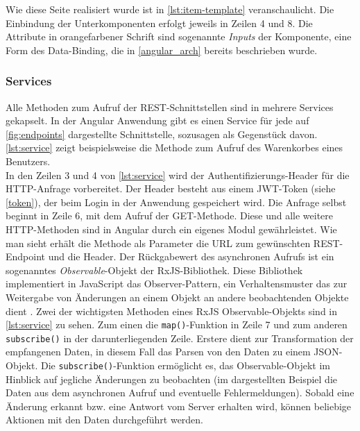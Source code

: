 Wie diese Seite realisiert wurde ist in \cref{lst:item-template} veranschaulicht. Die Einbindung der Unterkomponenten erfolgt jeweils in Zeilen 4 und 8. Die Attribute in orangefarbener Schrift sind sogenannte \textit{Inputs} der Komponente, eine Form des Data-Binding, die in \cref{angular_arch} bereits beschrieben wurde.
\\


\subsubsection{Services}
Alle Methoden zum Aufruf der \acs{REST}-Schnittstellen sind in mehrere Services gekapselt. In der Angular Anwendung gibt es einen Service für jede auf \cref{fig:endpoints} dargestellte Schnittstelle, sozusagen als Gegenstück davon. \cref{lst:service} zeigt beispielsweise die Methode zum Aufruf des Warenkorbes eines Benutzers.
\\


In den Zeilen 3 und 4 von \cref{lst:service} wird der Authentifizierungs-Header für die HTTP-Anfrage vorbereitet. Der Header besteht aus einem JWT-Token (siehe \cref{token}), der beim Login in der Anwendung gespeichert wird. Die Anfrage selbst beginnt in Zeile 6, mit dem Aufruf der GET-Methode. Diese und alle weitere HTTP-Methoden sind in Angular durch ein eigenes Modul gewährleistet. Wie man sieht erhält die Methode als Parameter die URL zum gewünschten REST-Endpoint und die Header. Der Rückgabewert des asynchronen Aufrufs ist ein sogenanntes \textit{Observable}-Objekt der RxJS-Bibliothek. Diese Bibliothek implementiert in JavaScript das Observer-Pattern, ein Verhaltensmuster das zur Weitergabe von Änderungen an einem Objekt an andere beobachtenden Objekte dient \cite{Angular.io2017b}.
\newpage
Zwei der wichtigsten Methoden eines RxJS Observable-Objekts sind in \cref{lst:service} zu sehen. Zum einen die \texttt{map()}-Funktion in Zeile 7 und zum anderen \texttt{subscribe()} in der darunterliegenden Zeile. Erstere dient zur Transformation der empfangenen Daten, in diesem Fall das Parsen von den Daten zu einem JSON-Objekt. Die \texttt{subscribe()}-Funktion ermöglicht es, das Observable-Objekt im Hinblick auf jegliche Änderungen zu beobachten (im dargestellten Beispiel die Daten aus dem asynchronen Aufruf und eventuelle Fehlermeldungen). Sobald eine Änderung erkannt bzw. eine Antwort vom Server erhalten wird, können beliebige Aktionen mit den Daten durchgeführt werden.

